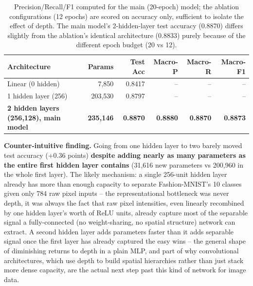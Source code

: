 \documentclass[11pt,a4paper]{article}
\begin{document}
\begin{table}[H]
\centering
\small
\begin{tabular}{lrrrrr}
\toprule
\textbf{Architecture} & \textbf{Params} & \textbf{Test Acc} & \textbf{Macro-P} & \textbf{Macro-R} & \textbf{Macro-F1} \\
\midrule
Linear (0 hidden) & 7,850 & 0.8417 & -- & -- & -- \\
1 hidden layer (256) & 203,530 & 0.8797 & -- & -- & -- \\
\textbf{2 hidden layers (256,128), main model} & \textbf{235,146} & \textbf{0.8870} & \textbf{0.8880} & \textbf{0.8870} & \textbf{0.8873} \\
\bottomrule
\end{tabular}
\caption{Precision/Recall/F1 computed for the main (20-epoch) model; the ablation
configurations (12 epochs) are scored on accuracy only, sufficient to isolate the effect
of depth. The main model's 2-hidden-layer test accuracy (0.8870) differs slightly from
the ablation's identical architecture (0.8833) purely because of the different epoch
budget (20 vs 12).}
\end{table}

\textbf{Counter-intuitive finding.} Going from one hidden layer to two barely moved test
accuracy (+0.36 points) \textbf{despite adding nearly as many parameters as the entire
first hidden layer contains} (31,616 new parameters vs 200,960 in the whole first
layer). The likely mechanism: a single 256-unit hidden layer already has more than
enough capacity to separate Fashion-MNIST's 10 classes given only 784 raw pixel inputs
-- the representational bottleneck was never depth, it was always the fact that raw
pixel intensities, even linearly recombined by one hidden layer's worth of ReLU units,
already capture most of the separable signal a fully-connected (no weight-sharing, no
spatial structure) network can extract. A second hidden layer adds parameters faster
than it adds separable signal once the first layer has already captured the easy wins --
the general shape of diminishing returns to depth in a plain MLP, and part of why
convolutional architectures, which use depth to build spatial hierarchies rather than
just stack more dense capacity, are the actual next step past this kind of network for
image data.
\end{document}
